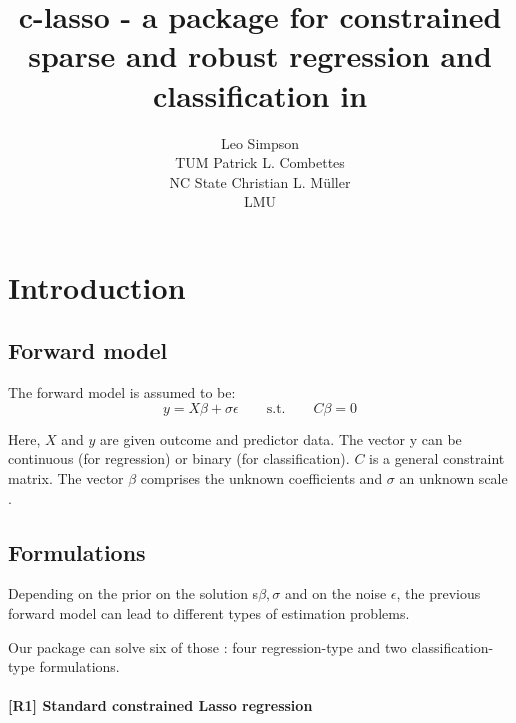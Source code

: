 \documentclass[article]{jss}
\author{Leo Simpson \\TUM
   \And Patrick L. Combettes \\NC State
   \And Christian L. M\"uller\\LMU}
\title{c-lasso - a package for constrained sparse and robust regression and classification in \proglang{Python}}
\begin{document}



\newpage
\section{Introduction} \label{sec:intro}

\subsection{Forward model} \label{sec:forward}

The forward model is assumed to be:
\begin{equation}
y = X \beta + \sigma \epsilon \qquad \textrm{s.t.} \qquad C\beta=0
\end{equation}

Here, $X$ and $y$ are given outcome and predictor data. The vector y can be continuous (for
regression) or binary (for classification). $C$ is a general constraint matrix. The vector
$\beta$ comprises the unknown coefficients and $\sigma$ an unknown scale \citep{}.

\subsection{Formulations} \label{sec:formulation}

Depending on the prior on the solution s$\beta, \sigma$ and on the noise $\epsilon$, the previous forward model can lead to different types of estimation problems. 

Our package can solve six of those : four regression-type and two classification-type formulations.

\paragraph{[R1] Standard constrained Lasso regression} 
\end{document}
